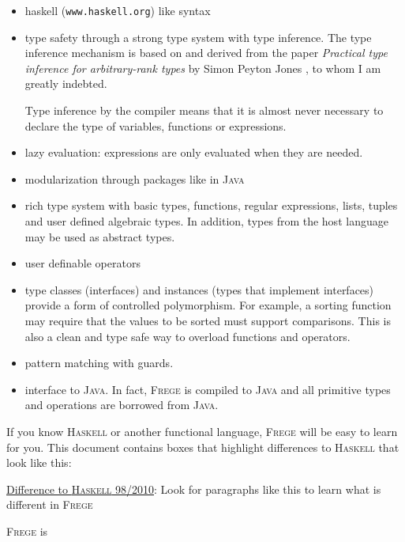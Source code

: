 \documentclass[a4paper,landscape,twocolumn]{report}
\newcommand{\boxquote}[3]{
\begin{center}
\colorbox{#1}%
{\parbox{0.45\textwidth}{
\sf
\underline{#2}:
#3
}}
\end{center}}
\newcommand{\hasdiff}[1]{\boxquote{rot}{Difference to \haskell{} 98/2010}{#1}}
\newcommand{\haskell}[0]{\textsc{Haskell}}
\newcommand{\frege}[0]{\textsc{Frege}}
\newcommand{\java}[0]{\textsc{Java}}
\begin{document}
\begin{itemize}

\item haskell{} ({\tt www.haskell.org}) like syntax

\item type safety through a strong type system with type inference. The
type inference mechanism is based on and derived from the paper
\emph{Practical type inference for arbitrary-rank types} by Simon
Peyton Jones \cite{ptifart}, to whom I am greatly indebted.

Type inference by the compiler means that it is
almost never necessary to declare the type of variables, functions or
expressions.

\item lazy evaluation: expressions are only evaluated when they are
needed.

\item modularization through packages like in \java{}

\item rich type system with basic types, functions, regular expressions,
lists, tuples and user defined algebraic types.
In addition, types from the host language may be used as abstract
types.

\item user definable operators

\item type classes (interfaces) and instances (types that
implement interfaces) provide a form of controlled polymorphism. For
example, a sorting function may require that the values to be sorted
must support comparisons. This is also a clean and type safe way to
overload functions and operators.

\item pattern matching with guards.

\item interface to \java{}. In fact, \frege{} is
compiled to \java{} and
all primitive types and operations are borrowed from \java{}.


\end{itemize}

If you know \haskell{} or another functional language,
\frege{} will be easy to learn for you. This document contains boxes
that highlight differences to \haskell{} that look like this:

\hasdiff{Look for paragraphs like this to learn what is different in
\frege{}}

\frege{} is
\end{document}
